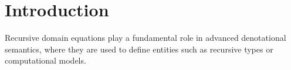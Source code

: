 \section{Introduction}
\nocite{winskel1993formal}
\nocite{bos-hemerik}

Recursive domain equations play a fundamental role in advanced denotational semantics, where they are used to define entities such as recursive types or computational models. 
